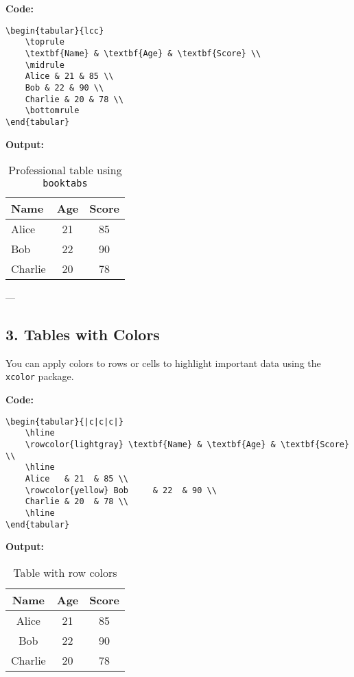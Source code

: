 \documentclass{article}
\begin{document}
\textbf{Code:}
\begin{verbatim}
\begin{tabular}{lcc}
    \toprule
    \textbf{Name} & \textbf{Age} & \textbf{Score} \\
    \midrule
    Alice & 21 & 85 \\
    Bob & 22 & 90 \\
    Charlie & 20 & 78 \\
    \bottomrule
\end{tabular}
\end{verbatim}

\textbf{Output:}
\begin{table}[h]
    \centering
    \begin{tabular}{lcc}
        \toprule
        \textbf{Name} & \textbf{Age} & \textbf{Score} \\
        \midrule
        Alice   & 21  & 85 \\
        Bob     & 22  & 90 \\
        Charlie & 20  & 78 \\
        \bottomrule
    \end{tabular}
    \caption{Professional table using \texttt{booktabs}}
\end{table}

---

\subsection*{3. Tables with Colors}

You can apply colors to rows or cells to highlight important data using the \texttt{xcolor} package.

\textbf{Code:}
\begin{verbatim}
\begin{tabular}{|c|c|c|}
    \hline
    \rowcolor{lightgray} \textbf{Name} & \textbf{Age} & \textbf{Score} \\
    \hline
    Alice   & 21  & 85 \\
    \rowcolor{yellow} Bob     & 22  & 90 \\
    Charlie & 20  & 78 \\
    \hline
\end{tabular}
\end{verbatim}

\textbf{Output:}
\begin{table}[h]
    \centering
    \begin{tabular}{|c|c|c|}
        \hline
        \rowcolor{lightgray} \textbf{Name} & \textbf{Age} & \textbf{Score} \\
        \hline
        Alice   & 21  & 85 \\
        \rowcolor{yellow} Bob     & 22  & 90 \\
        Charlie & 20  & 78 \\
        \hline
    \end{tabular}
    \caption{Table with row colors}
\end{table}
\end{document}

